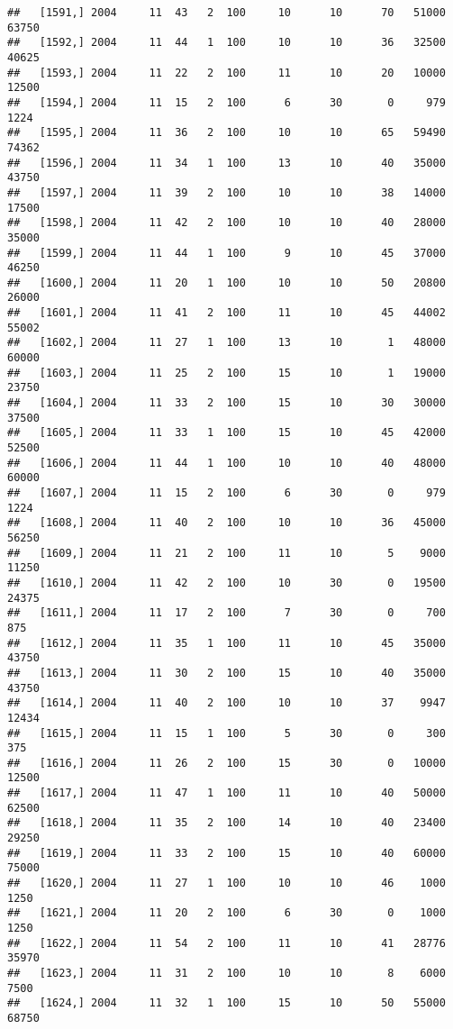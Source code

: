 \documentclass{article}\usepackage[]{graphicx}\usepackage[]{color}
\makeatletter
\newenvironment{kframe}{%
 \def\at@end@of@kframe{}%
 \ifinner\ifhmode%
  \def\at@end@of@kframe{\end{minipage}}%
  \begin{minipage}{\columnwidth}%
 \fi\fi%
 \def\FrameCommand##1{\hskip\@totalleftmargin \hskip-\fboxsep
 \colorbox{shadecolor}{##1}\hskip-\fboxsep
     \hskip-\linewidth \hskip-\@totalleftmargin \hskip\columnwidth}%
 \MakeFramed {\advance\hsize-\width
   \@totalleftmargin\z@ \linewidth\hsize
   \@setminipage}}%
 {\par\unskip\endMakeFramed%
 \at@end@of@kframe}
\newenvironment{knitrout}{}{} %
\makeatother
\begin{document}
\begin{knitrout}
\begin{kframe}
\begin{verbatim}
##   [1591,] 2004     11  43   2  100     10      10      70   51000   63750
##   [1592,] 2004     11  44   1  100     10      10      36   32500   40625
##   [1593,] 2004     11  22   2  100     11      10      20   10000   12500
##   [1594,] 2004     11  15   2  100      6      30       0     979    1224
##   [1595,] 2004     11  36   2  100     10      10      65   59490   74362
##   [1596,] 2004     11  34   1  100     13      10      40   35000   43750
##   [1597,] 2004     11  39   2  100     10      10      38   14000   17500
##   [1598,] 2004     11  42   2  100     10      10      40   28000   35000
##   [1599,] 2004     11  44   1  100      9      10      45   37000   46250
##   [1600,] 2004     11  20   1  100     10      10      50   20800   26000
##   [1601,] 2004     11  41   2  100     11      10      45   44002   55002
##   [1602,] 2004     11  27   1  100     13      10       1   48000   60000
##   [1603,] 2004     11  25   2  100     15      10       1   19000   23750
##   [1604,] 2004     11  33   2  100     15      10      30   30000   37500
##   [1605,] 2004     11  33   1  100     15      10      45   42000   52500
##   [1606,] 2004     11  44   1  100     10      10      40   48000   60000
##   [1607,] 2004     11  15   2  100      6      30       0     979    1224
##   [1608,] 2004     11  40   2  100     10      10      36   45000   56250
##   [1609,] 2004     11  21   2  100     11      10       5    9000   11250
##   [1610,] 2004     11  42   2  100     10      30       0   19500   24375
##   [1611,] 2004     11  17   2  100      7      30       0     700     875
##   [1612,] 2004     11  35   1  100     11      10      45   35000   43750
##   [1613,] 2004     11  30   2  100     15      10      40   35000   43750
##   [1614,] 2004     11  40   2  100     10      10      37    9947   12434
##   [1615,] 2004     11  15   1  100      5      30       0     300     375
##   [1616,] 2004     11  26   2  100     15      30       0   10000   12500
##   [1617,] 2004     11  47   1  100     11      10      40   50000   62500
##   [1618,] 2004     11  35   2  100     14      10      40   23400   29250
##   [1619,] 2004     11  33   2  100     15      10      40   60000   75000
##   [1620,] 2004     11  27   1  100     10      10      46    1000    1250
##   [1621,] 2004     11  20   2  100      6      30       0    1000    1250
##   [1622,] 2004     11  54   2  100     11      10      41   28776   35970
##   [1623,] 2004     11  31   2  100     10      10       8    6000    7500
##   [1624,] 2004     11  32   1  100     15      10      50   55000   68750

\end{verbatim}
\end{kframe}
\end{knitrout}
\end{document}
